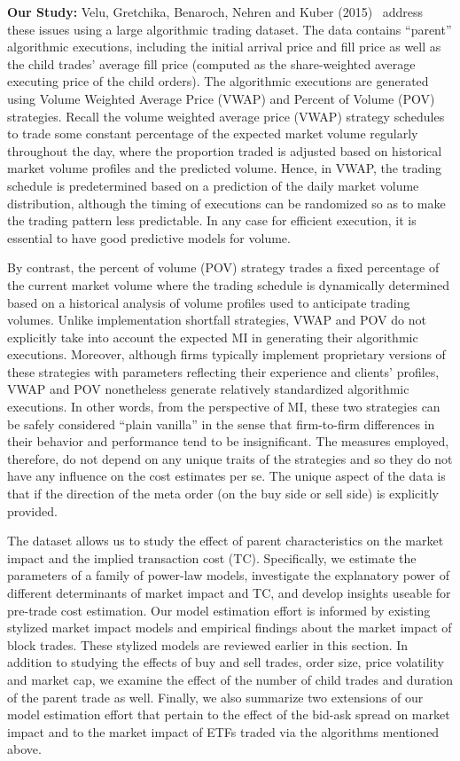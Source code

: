 \noindent\textbf{Our Study:} Velu, Gretchika, Benaroch, Nehren and Kuber (2015)~\cite{unpub} address these issues using a large algorithmic trading dataset. The data contains ``parent'' algorithmic executions, including the initial arrival price and fill price as well as the child trades' average fill price (computed as the share-weighted average executing price of the child orders). The algorithmic executions are generated using Volume Weighted Average Price (VWAP) and Percent of Volume (POV) strategies.\label{in:pov1} Recall the volume weighted average price (VWAP) strategy schedules to trade some constant percentage of the expected market volume regularly throughout the day, where the proportion traded is adjusted based on historical market volume profiles and the predicted volume. Hence, in VWAP, the trading schedule is predetermined based on a prediction of the daily market volume distribution, although the timing of executions can be randomized so as to make the trading pattern less predictable. In any case for efficient execution, it is essential to have good predictive models for volume. 


By contrast, the percent of volume (POV) strategy trades a fixed percentage of the current market volume where the trading schedule is dynamically determined based on a historical analysis of volume profiles used to anticipate trading volumes. Unlike implementation shortfall strategies, VWAP and POV do not explicitly take into account the expected MI in generating their algorithmic executions. Moreover, although firms typically implement proprietary versions of these strategies with parameters reflecting their experience and clients' profiles, VWAP and POV nonetheless generate relatively standardized algorithmic executions. In other words, from the perspective of MI, these two strategies can be safely considered ``plain vanilla'' in the sense that firm-to-firm differences in their behavior and performance tend to be insignificant. The measures employed, therefore, do not depend on any unique traits of the strategies and so they do not have any influence on the cost estimates per se. The unique aspect of the data is that if the direction of the meta order (on the buy side or sell side) is explicitly provided. 


The dataset allows us to study the effect of parent characteristics on the market impact and the implied transaction cost (TC). Specifically, we estimate the parameters of a family of power-law models, investigate the explanatory power of different determinants of market impact and TC, and develop insights useable for pre-trade cost estimation. Our model estimation effort is informed by existing stylized market impact models and empirical findings about the market impact of block trades. These stylized models are reviewed earlier in this section. In addition to studying the effects of buy and sell trades, order size, price volatility and market cap, we examine the effect of the number of child trades and duration of the parent trade as well. Finally, we also summarize two extensions of our model estimation effort that pertain to the effect of the bid-ask spread on market impact and to the market impact of ETFs traded via the algorithms mentioned above.


